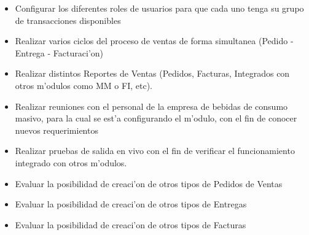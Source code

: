 \begin{itemize}
\item Configurar los diferentes roles de usuarios para que cada uno tenga su grupo de transacciones disponibles
\item Realizar varios ciclos del proceso de ventas de forma simultanea (Pedido - Entrega - Facturaci'on)
\item Realizar distintos Reportes de Ventas (Pedidos, Facturas, Integrados con otros m'odulos como MM o FI, etc).
\item Realizar reuniones con el personal de la empresa de bebidas de consumo masivo, para la cual se est'a configurando el m'odulo, con el fin de conocer nuevos requerimientos
\item Realizar pruebas de salida en vivo con el fin de verificar el funcionamiento integrado con otros m'odulos.
\item Evaluar la posibilidad de creaci'on de otros tipos de Pedidos de Ventas 
\item Evaluar la posibilidad de creaci'on de otros tipos de Entregas
\item Evaluar la posibilidad de creaci'on de otros tipos de Facturas 
\end{itemize}